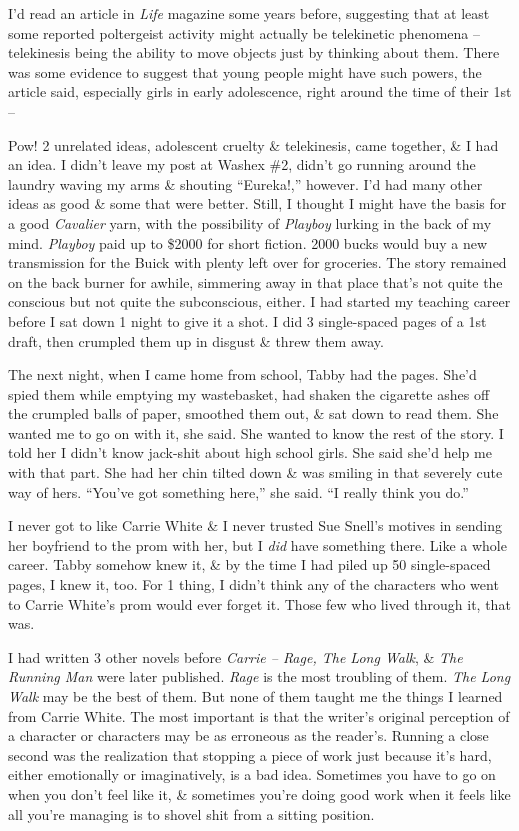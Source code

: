 \documentclass{article}
\numberwithin{equation}{section}
\begin{document}
I'd read an article in \textit{Life} magazine some years before, suggesting that at least some reported poltergeist activity might actually be telekinetic phenomena -- telekinesis being the ability to move objects just by thinking about them. There was some evidence to suggest that young people might have such powers, the article said, especially girls in early adolescence, right around the time of their 1st --

Pow! 2 unrelated ideas, adolescent cruelty \& telekinesis, came together, \& I had an idea. I didn't leave my post at Washex \#2, didn't go running around the laundry waving my arms \& shouting ``Eureka!,'' however. I'd had many other ideas as good \& some that were better. Still, I thought I might have the basis for a good \textit{Cavalier} yarn, with the possibility of \textit{Playboy} lurking in the back of my mind. \textit{Playboy} paid up to \$2000 for short fiction. 2000 bucks would buy a new transmission for the Buick with plenty left over for groceries. The story remained on the back burner for awhile, simmering away in that place that's not quite the conscious but not quite the subconscious, either. I had started my teaching career before I sat down 1 night to give it a shot. I did 3 single-spaced pages of a 1st draft, then crumpled them up in disgust \& threw them away.

The next night, when I came home from school, Tabby had the pages. She'd spied them while emptying my wastebasket, had shaken the cigarette ashes off the crumpled balls of paper, smoothed them out, \& sat down to read them. She wanted me to go on with it, she said. She wanted to know the rest of the story. I told her I didn't know jack-shit about high school girls. She said she'd help me with that part. She had her chin tilted down \& was smiling in that severely cute way of hers. ``You've got something here,'' she said. ``I really think you do.''

 I never got to like Carrie White \& I never trusted Sue Snell's motives in sending her boyfriend to the prom with her, but I \textit{did} have something there. Like a whole career. Tabby somehow knew it, \& by the time I had piled up 50 single-spaced pages, I knew it, too. For 1 thing, I didn't think any of the characters who went to Carrie White's prom would ever forget it. Those few who lived through it, that was.

I had written 3 other novels before \textit{Carrie -- Rage, The Long Walk}, \& \textit{The Running Man} were later published. \textit{Rage} is the most troubling of them. \textit{The Long Walk} may be the best of them. But none of them taught me the things I learned from Carrie White. The most important is that the writer's original perception of a character or characters may be as erroneous as the reader's. Running a close second was the realization that stopping a piece of work just because it's hard, either emotionally or imaginatively, is a bad idea. Sometimes you have to go on when you don't feel like it, \& sometimes you're doing good work when it feels like all you're managing is to shovel shit from a sitting position.
\end{document}
